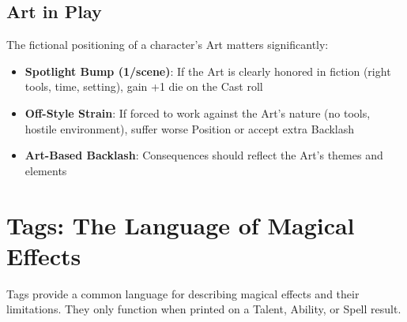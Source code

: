 \subsection*{Art in Play}

The fictional positioning of a character's Art matters significantly:

\begin{itemize}
    \item \textbf{Spotlight Bump (1/scene)}: If the Art is clearly honored in fiction (right tools, time, setting), gain +1 die on the Cast roll
    \item \textbf{Off-Style Strain}: If forced to work against the Art's nature (no tools, hostile environment), suffer worse Position or accept extra Backlash
    \item \textbf{Art-Based Backlash}: Consequences should reflect the Art's themes and elements
\end{itemize}

\section*{Tags: The Language of Magical Effects}

Tags provide a common language for describing magical effects and their limitations. They only function when printed on a Talent, Ability, or Spell result.


